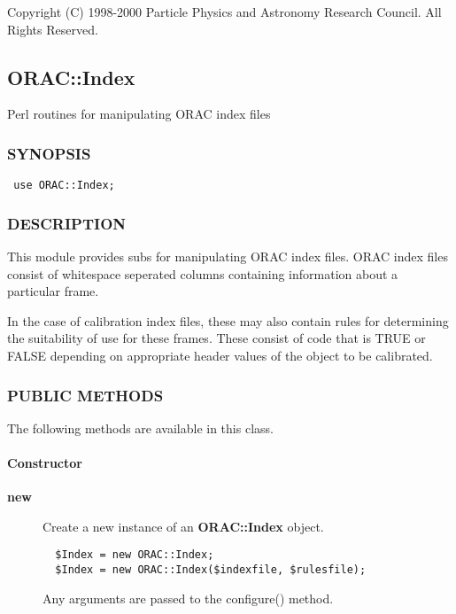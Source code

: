 Copyright (C) 1998-2000 Particle Physics and Astronomy Research
Council. All Rights Reserved.

\subsection{ORAC::Index\label{ORAC::Index}}


Perl routines for manipulating ORAC index files

\subsubsection*{SYNOPSIS\label{ORAC::Index_SYNOPSIS}}
\begin{verbatim}
 use ORAC::Index;
\end{verbatim}
\subsubsection*{DESCRIPTION\label{ORAC::Index_DESCRIPTION}}


This module provides subs for manipulating ORAC index files. ORAC
index files consist of whitespace seperated columns containing
information about a particular frame.



In the case of calibration index files, these may also contain rules
for determining the suitability of use for these frames. These consist
of code that is TRUE or FALSE depending on appropriate header values
of the object to be calibrated.

\subsubsection*{PUBLIC METHODS\label{ORAC::Index_PUBLIC_METHODS}}


The following methods are available in this class.

\paragraph*{Constructor\label{ORAC::Index_Constructor}}
\begin{description}

\item[{\textbf{new}}] \mbox{}

Create a new instance of an \textbf{ORAC::Index} object.

\begin{verbatim}
  $Index = new ORAC::Index;
  $Index = new ORAC::Index($indexfile, $rulesfile);
\end{verbatim}


Any arguments are passed to the configure() method.

\end{description}
